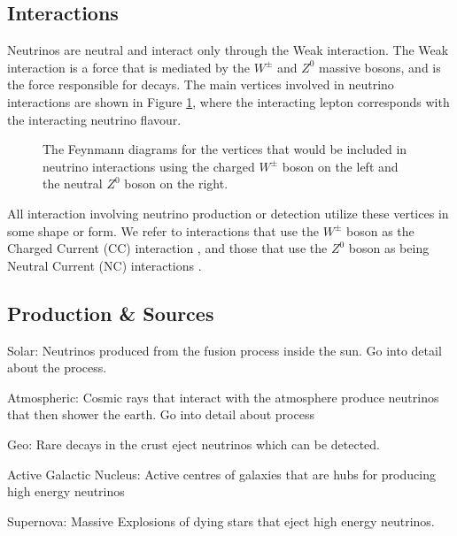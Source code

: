 \subsection{Interactions}

Neutrinos are neutral and interact only through the Weak interaction. The Weak interaction is a force that is mediated by the $W^{\pm}$ and $Z^{0}$ massive bosons, and is the force responsible for decays. The main vertices involved in neutrino interactions are shown in Figure \ref{fig:nvert}, where the interacting lepton corresponds with the interacting neutrino flavour. 

\begin{figure}
  \centering
  \hspace{2em}
  \caption{The Feynmann diagrams for the vertices that would be included in neutrino interactions using the charged $W^{\pm}$ boson on the left and the neutral $Z^{0}$ boson on the right.}
  \label{fig:nvert}
\end{figure}

All interaction involving neutrino production or detection utilize these vertices in some shape or form. We refer to interactions that use the $W^{\pm}$ boson as the Charged Current (CC) interaction \cite{currents}, and those that use the $Z^{0}$ boson as being Neutral Current (NC) interactions \cite{currents}. 

\subsection{Production \& Sources}

Solar: Neutrinos produced from the fusion process inside the sun. Go into detail about the process.

Atmospheric: Cosmic rays that interact with the atmosphere produce neutrinos that then shower the earth. Go into detail about process

Geo: Rare decays in the crust eject neutrinos which can be detected. 

Active Galactic Nucleus: Active centres of galaxies that are hubs for producing high energy neutrinos

Supernova: Massive Explosions of dying stars that eject high energy neutrinos.






